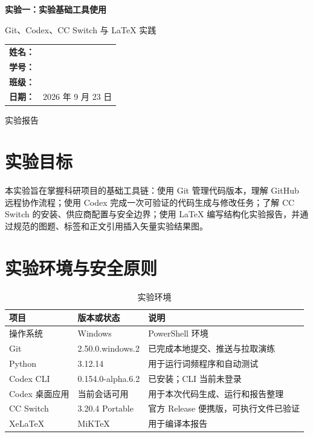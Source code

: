 \documentclass[UTF8,a4paper,zihao=-4]{ctexart}
\begin{document}
\begin{titlepage}
  \centering
  \vspace*{2.2cm}
  {\Huge\bfseries 实验一：实验基础工具使用\par}
  \vspace{0.7cm}
  {\Large Git、Codex、CC Switch 与 LaTeX 实践\par}
  \vspace{2.2cm}
  \renewcommand{\arraystretch}{1.8}
  \begin{tabular}{>{\bfseries}r l}
    姓名： & \underline{\hspace{7cm}} \\
    学号： & \underline{\hspace{7cm}} \\
    班级： & \underline{\hspace{7cm}} \\
    日期： & 2026 年 9 月 23 日 \\
  \end{tabular}
  \vfill
  {\large 实验报告\par}
\end{titlepage}

\tableofcontents
\newpage

\section{实验目标}

本实验旨在掌握科研项目的基础工具链：使用 Git 管理代码版本，理解 GitHub 远程协作流程；使用 Codex 完成一次可验证的代码生成与修改任务；了解 CC Switch 的安装、供应商配置与安全边界；使用 LaTeX 编写结构化实验报告，并通过规范的图题、标签和正文引用插入矢量实验结果图。

\section{实验环境与安全原则}

\begin{table}[H]
  \centering
  \caption{实验环境}
  \label{tab:env}
  \begin{tabular}{lll}
    \toprule
    项目 & 版本或状态 & 说明 \\
    \midrule
    操作系统 & Windows & PowerShell 环境 \\
    Git & 2.50.0.windows.2 & 已完成本地提交、推送与拉取演练 \\
    Python & 3.12.14 & 用于运行词频程序和自动测试 \\
    Codex CLI & 0.154.0-alpha.6.2 & 已安装；CLI 当前未登录 \\
    Codex 桌面应用 & 当前会话可用 & 用于本次代码生成、运行和报告整理 \\
    CC Switch & 3.20.4 Portable & 官方 Release 便携版，可执行文件已验证 \\
    XeLaTeX & MiKTeX & 用于编译本报告 \\
    \bottomrule
  \end{tabular}
\end{table}
\end{document}
